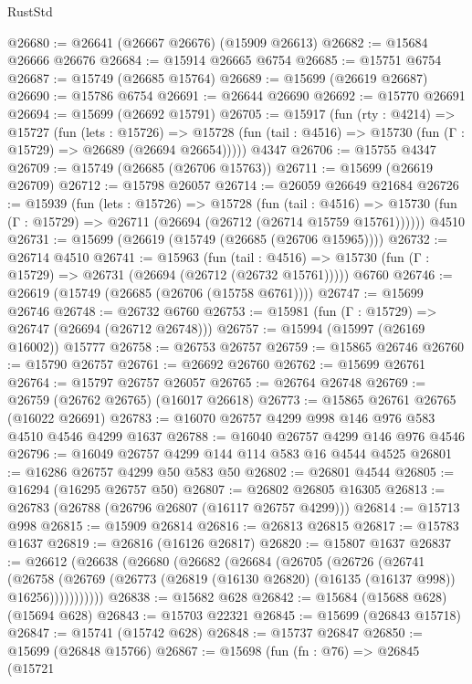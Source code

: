 \begin{lexlean}{RustStd}
\begin{coremodule}
@26680 := @26641 (@26667 @26676) (@15909 @26613)
@26682 := @15684 @26666 @26676
@26684 := @15914 @26665 @6754
@26685 := @15751 @6754
@26687 := @15749 (@26685 @15764)
@26689 := @15699 (@26619 @26687)
@26690 := @15786 @6754
@26691 := @26644 @26690
@26692 := @15770 @26691
@26694 := @15699 (@26692 @15791)
@26705 := @15917
    (fun (rty : @4214) =>
    @15727
      (fun (lets : @15726) =>
      @15728 (fun (tail : @4516) => @15730 (fun (Γ : @15729) => @26689 (@26694 @26654)))))
    @4347
@26706 := @15755 @4347
@26709 := @15749 (@26685 (@26706 @15763))
@26711 := @15699 (@26619 @26709)
@26712 := @15798 @26057
@26714 := @26059 @26649 @21684
@26726 := @15939
    (fun (lets : @15726) =>
    @15728
      (fun (tail : @4516) =>
      @15730 (fun (Γ : @15729) => @26711 (@26694 (@26712 (@26714 @15759 @15761))))))
    @4510
@26731 := @15699 (@26619 (@15749 (@26685 (@26706 @15965))))
@26732 := @26714 @4510
@26741 := @15963
    (fun (tail : @4516) => @15730 (fun (Γ : @15729) => @26731 (@26694 (@26712 (@26732 @15761)))))
    @6760
@26746 := @26619 (@15749 (@26685 (@26706 (@15758 @6761))))
@26747 := @15699 @26746
@26748 := @26732 @6760
@26753 := @15981 (fun (Γ : @15729) => @26747 (@26694 (@26712 @26748)))
@26757 := @15994 (@15997 (@26169 @16002)) @15777
@26758 := @26753 @26757
@26759 := @15865 @26746
@26760 := @15790 @26757
@26761 := @26692 @26760
@26762 := @15699 @26761
@26764 := @15797 @26757 @26057
@26765 := @26764 @26748
@26769 := @26759 (@26762 @26765) (@16017 @26618)
@26773 := @15865 @26761 @26765 (@16022 @26691)
@26783 := @16070 @26757 @4299 @998 @146 @976 @583 @4510 @4546 @4299 @1637
@26788 := @16040 @26757 @4299 @146 @976 @4546
@26796 := @16049 @26757 @4299 @144 @114 @583 @16 @4544 @4525
@26801 := @16286 @26757 @4299 @50 @583 @50
@26802 := @26801 @4544
@26805 := @16294 (@16295 @26757 @50)
@26807 := @26802 @26805 @16305
@26813 := @26783 (@26788 (@26796 @26807 (@16117 @26757 @4299)))
@26814 := @15713 @998
@26815 := @15909 @26814
@26816 := @26813 @26815
@26817 := @15783 @1637
@26819 := @26816 (@16126 @26817)
@26820 := @15807 @1637
@26837 := @26612
    (@26638
      (@26680
        (@26682
          (@26684
            (@26705
              (@26726
                (@26741
                  (@26758
                    (@26769 (@26773 (@26819 (@16130 @26820) (@16135 (@16137 @998)) @16256)))))))))))
@26838 := @15682 @628
@26842 := @15684 (@15688 @628) (@15694 @628)
@26843 := @15703 @22321
@26845 := @15699 (@26843 @15718)
@26847 := @15741 (@15742 @628)
@26848 := @15737 @26847
@26850 := @15699 (@26848 @15766)
@26867 := @15698
    (fun (fn : @76) =>
    @26845
      (@15721

\end{coremodule}
\end{lexlean}
